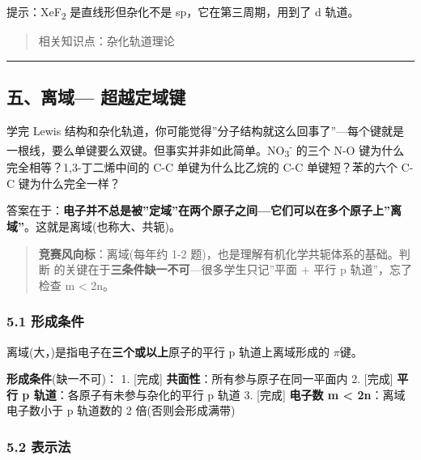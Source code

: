 \documentclass[a4paper,11pt]{ctexart}
\newcommand{\箭}{\ensuremath{\rightarrow}}
\newcommand{\左箭}{\ensuremath{\leftarrow}}
\newcommand{\上箭}{\ensuremath{\uparrow}}
\newcommand{\下箭}{\ensuremath{\downarrow}}
\newcommand{\衡}{\ensuremath{\rightleftharpoons}}
\newcommand{\双箭}{\ensuremath{\leftrightarrow}}
\newcommand{\约等于}{\ensuremath{\approx}}
\newcommand{\小于等于}{\ensuremath{\leq}}
\newcommand{\大于等于}{\ensuremath{\geq}}
\newcommand{\不等于}{\ensuremath{\neq}}
\newcommand{\西格马}{\ensuremath{\sigma}}
\newcommand{\派}{\ensuremath{\pi}}
\begin{document}
提示：XeF\textsubscript{2} 是直线形但杂化不是 sp，它在第三周期，用到了 d 轨道。

\begin{quote}
相关知识点：杂化轨道理论
\end{quote}

\begin{center}\rule{0.5\linewidth}{0.5pt}\end{center}

\subsection{\texorpdfstring{五、离域 --- 超越定域键}{五、离域--- 超越定域键}}\label{ux4e94ux79bbux57df-ux8d85ux8d8aux5b9aux57dfux952e}

学完 Lewis 结构和杂化轨道，你可能觉得''分子结构就这么回事了''---每个键就是一根线，要么单键要么双键。但事实并非如此简单。NO\textsubscript{3}\textsuperscript{-} 的三个 N-O 键为什么完全相等？1,3-丁二烯中间的 C-C 单键为什么比乙烷的 C-C 单键短？苯的六个 C-C 键为什么完全一样？

答案在于：\textbf{电子并不总是被''定域''在两个原子之间---它们可以在多个原子上''离域''}。这就是离域(也称大、共轭)。

\begin{quote}
\textbf{竞赛风向标}：离域(每年约 1-2 题)，也是理解有机化学共轭体系的基础。判断  的关键在于\textbf{三条件缺一不可}---很多学生只记''平面 + 平行 p 轨道''，忘了检查 m \textless{} 2n。
\end{quote}

\subsubsection{5.1 形成条件}\label{ux5f62ux6210ux6761ux4ef6}

离域(大，)是指电子在\textbf{三个或以上}原子的平行 p 轨道上离域形成的 \派 键。

\textbf{形成条件}(缺一不可)：
1. {[}完成{]} \textbf{共面性}：所有参与原子在同一平面内
2. {[}完成{]} \textbf{平行 p 轨道}：各原子有未参与杂化的平行 p 轨道
3. {[}完成{]} \textbf{电子数 m \textless{} 2n}：离域电子数小于 p 轨道数的 2 倍(否则会形成满带)

\subsubsection{\texorpdfstring{5.2  表示法}{5.2 表示法}}\label{ux8868ux793aux6cd5}
\end{document}

